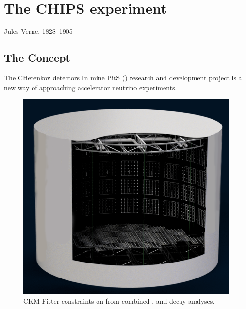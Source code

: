 \chapter{The CHIPS experiment}
\label{chap:chips}

{Jules Verne, 1828--1905}

\section{The \CHIPS Concept}
The CHerenkov detectors In mine PitS (\CHIPS) research and development project is a
new way of approaching accelerator neutrino experiments.


\begin{figure}
    \includegraphics[width=\largefigwidth]{diagrams/chips/chips_render_1}
    \caption[CKM Fitter constraints on \alphaCKM.]%
    {CKM Fitter constraints on \alphaCKM from combined \BToPiPi,
        \BToRhoPi and \BToRhoRho decay analyses.}
    \label{fig:chips_render_1}
\end{figure}

